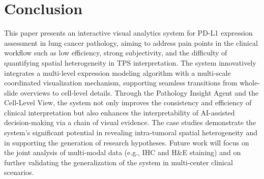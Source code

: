 \documentclass[journal]{vgtc}                     %
\begin{document}
\section{Conclusion}

This paper presents an interactive visual analytics system for PD-L1 expression assessment in lung cancer pathology, aiming to address pain points in the clinical workflow such as low efficiency, strong subjectivity, and the difficulty of quantifying spatial heterogeneity in TPS interpretation. The system innovatively integrates a multi-level expression modeling algorithm with a multi-scale coordinated visualization mechanism, supporting seamless transitions from whole-slide overviews to cell-level details. Through the Pathology Insight Agent and the Cell-Level View, the system not only improves the consistency and efficiency of clinical interpretation but also enhances the interpretability of AI-assisted decision-making via a chain of visual evidence. The case studies demonstrate the system's significant potential in revealing intra-tumoral spatial heterogeneity and in supporting the generation of research hypotheses. Future work will focus on the joint analysis of multi-modal data (e.g., IHC and H\&E staining) and on further validating the generalization of the system in multi-center clinical scenarios.





%
%
%




\appendix %
{} %
\end{document}
